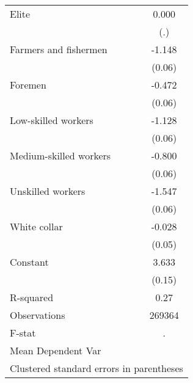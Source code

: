 {\begin{tabular}{l*{1}{c}}
Elite               &       0.000         \\
                    &         (.)         \\
Farmers and fishermen&      -1.148\sym{***}\\
                    &      (0.06)         \\
Foremen             &      -0.472\sym{***}\\
                    &      (0.06)         \\
Low-skilled workers &      -1.128\sym{***}\\
                    &      (0.06)         \\
Medium-skilled workers&      -0.800\sym{***}\\
                    &      (0.06)         \\
Unskilled workers   &      -1.547\sym{***}\\
                    &      (0.06)         \\
White collar        &      -0.028         \\
                    &      (0.05)         \\
Constant            &       3.633\sym{***}\\
                    &      (0.15)         \\
\hline
R-squared           &        0.27         \\
Observations        &      269364         \\
F-stat              &           .         \\
Mean Dependent Var  &                     \\
\hline\hline
\multicolumn{2}{l}{\footnotesize Clustered standard errors in parentheses}\\
\end{tabular}
}
